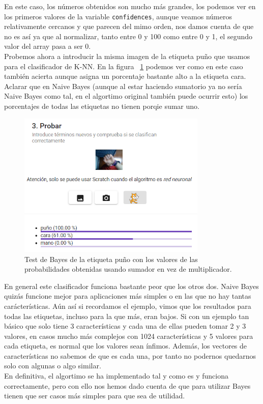 \documentclass[a4paper, 12pt]{book}
\begin{document}
En este caso, los números obtenidos son mucho más grandes, los podemos ver en los primeros valores de la variable \texttt{confidences}, aunque veamos números relativamente cercanos y que parecen del mimo orden, nos damos cuenta de que no es así ya que al normalizar, tanto entre 0 y 100 como entre 0 y 1, el segundo valor del array pasa a ser 0.\\
Probemos ahora a introducir la misma imagen de la etiqueta puño que usamos para el clasificador de K-NN. En la figura ~\ref{fig:bayestestpuno} podemos ver como en este caso también acierta aunque asigna un porcentaje bastante alto a la etiqueta cara. Aclarar que en Naive Bayes (aunque al estar haciendo sumatorio ya no sería Naive Bayes como tal, en el algortimo original también puede ocurrir esto) los porcentajes de todas las etiquetas no tienen porqie sumar uno.

\begin{figure}
	\centering
	\includegraphics[width=9cm, keepaspectratio]{img/bayestestpuno}
	\caption{Test de Bayes de la etiqueta puño con los valores de las probabilidades obtenidas usando sumador en vez de multiplicador.}			
	\label{fig:bayestestpuno}
\end{figure}

En general este clasificador funciona bastante peor que los otros dos. Naive Bayes quizás funcione mejor para aplicaciones más simples o en las que no hay tantas carácterísticas. Aún así si recordamos el ejemplo, vimos que los resultados para todas las etiquetas, incluso para la que más, eran bajos. Si con un ejemplo tan básico que solo tiene 3 características y cada una de ellas pueden tomar 2 y 3 valores, en casos mucho más complejos con 1024 características y 5 valores para cada etiqueta, es normal que los valores sean ínfimos. Además, los vectores de características no sabemos de que es cada una, por tanto no podernos quedarnos solo con algunas o algo similar.\\
En definitiva, el algortimo se ha implementado tal y como es y funciona correctamente, pero con ello nos hemos dado cuenta de que para utilizar Bayes tienen que ser casos más simples para que sea de utilidad.
\end{document}
